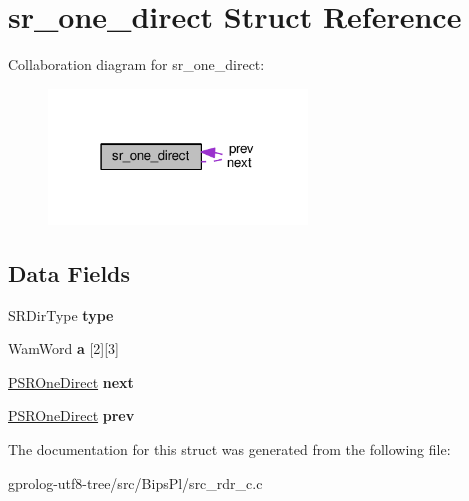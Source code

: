 \hypertarget{structsr__one__direct}{}\section{sr\+\_\+one\+\_\+direct Struct Reference}
\label{structsr__one__direct}


Collaboration diagram for sr\+\_\+one\+\_\+direct\+:\nopagebreak
\begin{figure}[H]
\begin{center}
\leavevmode
\includegraphics[width=195pt]{structsr__one__direct__coll__graph}
\end{center}
\end{figure}
\subsection*{Data Fields}
\begin{DoxyCompactItemize}
\item 
S\+R\+Dir\+Type {\bfseries type}\hypertarget{structsr__one__direct_ac59da886bfa2db8f18de3506965397f7}{}\label{structsr__one__direct_ac59da886bfa2db8f18de3506965397f7}

\item 
Wam\+Word {\bfseries a} \mbox{[}2\mbox{]}\mbox{[}3\mbox{]}\hypertarget{structsr__one__direct_abe60646d574e029facc37a9b2491a74b}{}\label{structsr__one__direct_abe60646d574e029facc37a9b2491a74b}

\item 
\hyperlink{structsr__one__direct}{P\+S\+R\+One\+Direct} {\bfseries next}\hypertarget{structsr__one__direct_a601890e68d977d3467e52ab3a7ce9703}{}\label{structsr__one__direct_a601890e68d977d3467e52ab3a7ce9703}

\item 
\hyperlink{structsr__one__direct}{P\+S\+R\+One\+Direct} {\bfseries prev}\hypertarget{structsr__one__direct_a25fd2e3df4af8e0f8cb89af0a1ea77f9}{}\label{structsr__one__direct_a25fd2e3df4af8e0f8cb89af0a1ea77f9}

\end{DoxyCompactItemize}


The documentation for this struct was generated from the following file\+:\begin{DoxyCompactItemize}
\item 
gprolog-\/utf8-\/tree/src/\+Bips\+Pl/src\+\_\+rdr\+\_\+c.\+c\end{DoxyCompactItemize}
